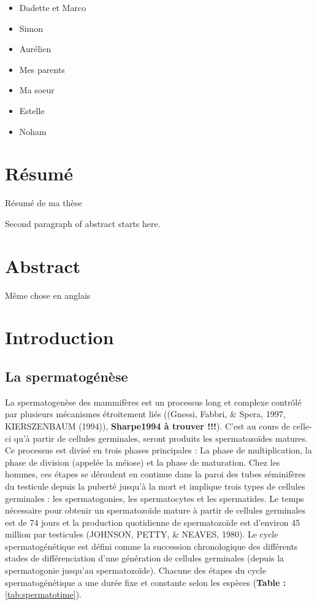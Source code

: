 \documentclass[12pt,twoside]{reedthesis}
\theoremstyle{definition}
\theoremstyle{definition}
\theoremstyle{remark}
\begin{document}
  \begin{itemize}
  \item
    Dadette et Marco\\
  \item
    Simon\\
  \item
    Aurélien
  \item
    Mes parents\\
  \item
    Ma soeur
  \item
    Estelle\\
  \item
    Noham
  \end{itemize}
  
  \chapter*{Résumé}\label{resume}
  
  Résumé de ma thèse \par
  Second paragraph of abstract starts here.
  
  \chapter*{Abstract}\label{abstract}
  
  Même chose en anglais
  
  \chapter{Introduction}\label{introInf}
  
  \section{La spermatogénèse}\label{la-spermatogenese}
  
  La spermatogenèse des mammifères est un processus long et complexe
  contrôlé par plusieurs mécanismes étroitement liés ((Gnessi, Fabbri, \&
  Spera, 1997, KIERSZENBAUM (1994)), \textbf{Sharpe1994 à trouver !!!}).
  C'est au cours de celle-ci qu'à partir de cellules germinales, seront
  produits les spermatozoïdes matures. Ce processus est divisé en trois
  phases principales : La phase de multiplication, la phase de division
  (appelée la méiose) et la phase de maturation. Chez les hommes, ces
  étapes se déroulent en continue dans la paroi des tubes séminifères du
  testicule depuis la puberté jusqu'à la mort et implique trois types de
  cellules germinales : les spermatogonies, les spermatocytes et les
  spermatides. Le temps nécessaire pour obtenir un spermatozoïde mature à
  partir de cellules germinales est de 74 jours et la production
  quotidienne de spermatozoïde est d'environ 45 million par testicules
  (JOHNSON, PETTY, \& NEAVES, 1980). Le cycle spermatogénétique est défini
  comme la succession chronologique des différents stades de
  différenciation d'une génération de cellules germinales (depuis la
  spermatogonie jusqu'au spermatozoïde). Chacune des étapes du cycle
  spermatogénétique a une durée fixe et constante selon les espèces
  (\textbf{Table : }\ref{tab:spermatotime}).
  
\end{document}
